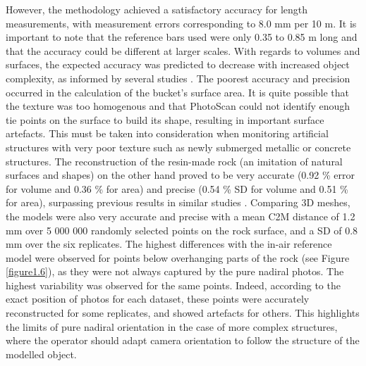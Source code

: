 However, the methodology achieved a satisfactory accuracy for length measurements, with measurement errors corresponding to 8.0 mm per 10 m. It is important to note that the reference bars used were only 0.35 to 0.85 m long and that the accuracy could be different at larger scales. With regards to volumes and surfaces, the expected accuracy was predicted to decrease with increased object complexity, as informed by several studies \citep{figueira_accuracy_2015, bryson_characterization_2017}. The poorest accuracy and precision occurred in the calculation of the bucket’s surface area. It is quite possible that the texture was too homogenous and that PhotoScan could not identify enough tie points on the surface to build its shape, resulting in important surface artefacts. This must be taken into consideration when monitoring artificial structures with very poor texture such as newly submerged metallic or concrete structures. The reconstruction of the resin-made rock (an imitation of natural surfaces and shapes) on the other hand proved to be very accurate (0.92 \% error for volume and 0.36 \% for area) and precise (0.54 \% SD for volume and 0.51 \% for area), surpassing previous results in similar studies \citep{figueira_accuracy_2015, bythell_three-dimensional_2001, courtney_estimating_2007, gutierrez-heredia_end_2016, lavy_quick_2015, shortis_calibration_2015}. Comparing 3D meshes, the models were also very accurate and precise with a mean C2M distance of 1.2 mm over 5 000 000 randomly selected points on the rock surface, and a SD of 0.8 mm over the six replicates. The highest differences with the in-air reference model were observed for points below overhanging parts of the rock (see Figure \ref{figure1.6}), as they were not always captured by the pure nadiral photos. The highest variability was observed for the same points. Indeed, according to the exact position of photos for each dataset, these points were accurately reconstructed for some replicates, and showed artefacts for others. This highlights the limits of pure nadiral orientation in the case of more complex structures, where the operator should adapt camera orientation to follow the structure of the modelled object.

